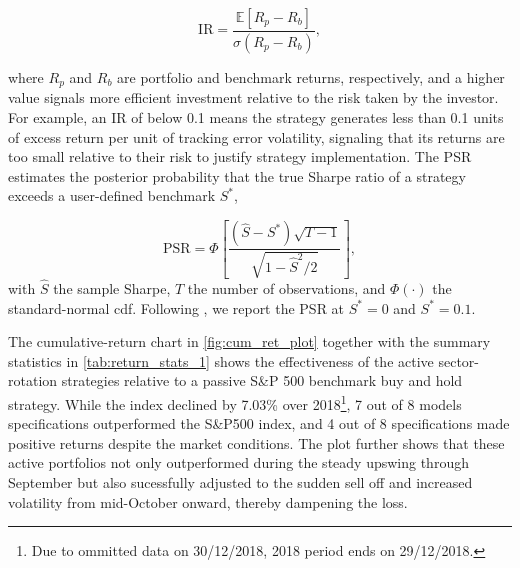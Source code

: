 \begin{equation}
\mathrm{IR}=\frac{\mathbb{E}\left[R_{p}-R_{b}\right]}{\sigma\left(R_{p}-R_{b}\right)},
\end{equation}

where $R_{p}$ and $R_{b}$ are portfolio and benchmark returns, respectively, and a higher value signals more efficient investment relative to the risk taken by the investor. For example, an IR of below 0.1 means the strategy generates less than 0.1 units of excess return per unit of tracking error volatility, signaling that its returns are too small relative to their risk to justify strategy implementation. The PSR estimates the posterior probability that the true Sharpe ratio of a strategy exceeds a user-defined benchmark $S^{*}$,

\begin{equation}
\mathrm{PSR}= \Phi\left[\frac{\left(\hat{S}-S^{*}\right)\sqrt{T-1}}{\sqrt{1-\hat{S}^{2}/2}}\right],
\end{equation}
with $\hat{S}$ the sample Sharpe, $T$ the number of observations, and $\Phi(\cdot)$ the standard-normal cdf. Following , we report the PSR at $S^{*}=0$ and $S^{*}=0.1$.

The cumulative-return chart in \cref{fig:cum_ret_plot} together with the summary statistics in \cref{tab:return_stats_1} shows the effectiveness of the active sector-rotation strategies relative to a passive S\&P 500 benchmark buy and hold strategy. While the index declined by 7.03\% over 2018\footnote{Due to ommitted data on 30/12/2018, 2018 period ends on 29/12/2018.}, 7 out of 8 models specifications outperformed the S\&P500 index, and 4 out of 8 specifications made positive returns despite the market conditions. The plot further shows that these active portfolios not only outperformed during the steady upswing through September but also sucessfully adjusted to the sudden sell off and increased volatility from mid-October onward, thereby dampening the loss.




